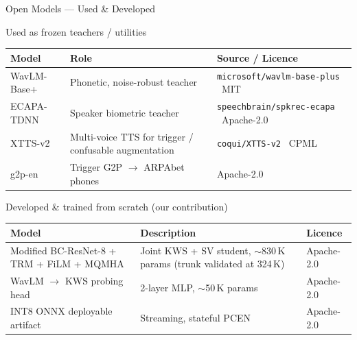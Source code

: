 \documentclass[aspectratio=169,10pt]{beamer}
\begin{document}
\begin{frame}{Open Models — Used \& Developed}
  \small
  \begin{block}{Used as frozen teachers / utilities}
    \centering
    \begin{tabular}{@{}p{3.2cm}p{6.0cm}p{3.5cm}@{}}
      \toprule
      \textbf{Model} & \textbf{Role} & \textbf{Source / Licence} \\
      \midrule
      WavLM-Base+  & Phonetic, noise-robust teacher    & \texttt{microsoft/wavlm-base-plus} \ MIT \\
      ECAPA-TDNN   & Speaker biometric teacher          & \texttt{speechbrain/spkrec-ecapa} \ Apache-2.0 \\
      XTTS-v2      & Multi-voice TTS for trigger / confusable augmentation & \texttt{coqui/XTTS-v2} \ CPML \\
      g2p-en       & Trigger G2P $\to$ ARPAbet phones   & Apache-2.0 \\
      \bottomrule
    \end{tabular}
  \end{block}
  \begin{block}{\color{srigold}Developed \& trained from scratch (our contribution)}
    \centering
    \begin{tabular}{@{}p{6.0cm}p{4.5cm}p{2.0cm}@{}}
      \toprule
      \textbf{Model} & \textbf{Description} & \textbf{Licence} \\
      \midrule
      Modified BC-ResNet-8 + TRM + FiLM + MQMHA  & Joint KWS + SV student, $\sim$830\,K params (trunk validated at 324\,K) & Apache-2.0 \\
      WavLM $\to$ KWS probing head                & 2-layer MLP, $\sim$50\,K params              & Apache-2.0 \\
      INT8 ONNX deployable artifact               & Streaming, stateful PCEN                     & Apache-2.0 \\
      \bottomrule
    \end{tabular}
  \end{block}
\end{frame}
\end{document}
